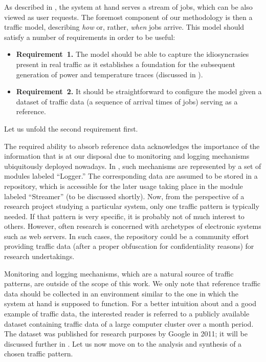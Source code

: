 As described in , the system at hand serves a stream
of jobs, which can be also viewed as user requests. The foremost component of
our methodology is then a traffic model, describing \emph{how} or, rather,
\emph{when} jobs arrive. This model should satisfy a number of requirements in
order to be useful:
\begin{itemize}
  \item {\bfseries Requirement~1.} The model should be able to capture the
  idiosyncrasies present in real traffic as it establishes a foundation for the
  subsequent generation of power and temperature traces (discussed in
  ).

  \item {\bfseries Requirement~2.} It should be straightforward to configure the
  model given a dataset of traffic data (a sequence of arrival times of jobs)
  serving as a reference.
\end{itemize}
Let us unfold the second requirement first.

The required ability to absorb reference data acknowledges the importance of the
information that is at our disposal due to monitoring and logging mechanisms
ubiquitously deployed nowadays. In , such mechanisms are
represented by a set of modules labeled ``Logger.'' The corresponding data are
assumed to be stored in a repository, which is accessible for the later usage
taking place in the module labeled ``Streamer'' (to be discussed shortly). Now,
from the perspective of a research project studying a particular system, only
one traffic pattern is typically needed. If that pattern is very specific, it is
probably not of much interest to others. However, often research is concerned
with archetypes of electronic systems such as web servers. In such cases, the
repository could be a community effort providing traffic data (after a proper
obfuscation for confidentiality reasons) for research undertakings.

Monitoring and logging mechanisms, which are a natural source of traffic
patterns, are outside of the scope of this work. We only note that reference
traffic data should be collected in an environment similar to the one in which
the system at hand is supposed to function. For a better intuition about and a
good example of traffic data, the interested reader is referred to a publicly
available dataset \cite{google} containing traffic data of a large computer
cluster over a month period. The dataset was published for research purposes by
Google in 2011; it will be discussed further in . Let us
now move on to the analysis and synthesis of a chosen traffic pattern.

